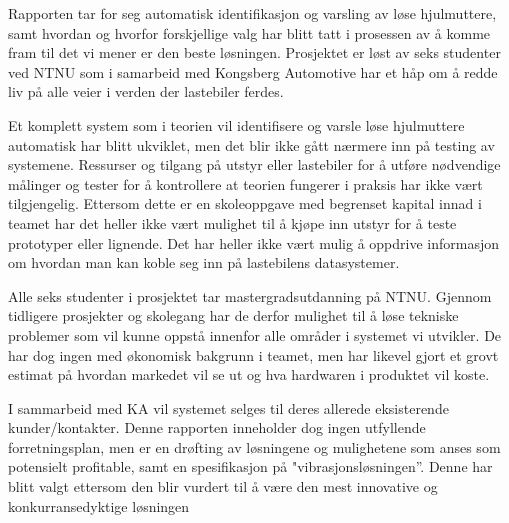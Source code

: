 Rapporten tar for seg automatisk identifikasjon og varsling av løse hjulmuttere, samt hvordan og hvorfor forskjellige
valg har blitt tatt i prosessen av å komme fram til det vi mener er den beste løsningen. Prosjektet er løst av seks studenter ved NTNU
som i samarbeid med Kongsberg Automotive har et håp om å redde liv på alle veier i verden der lastebiler ferdes. 

Et komplett system som i teorien vil identifisere og varsle løse hjulmuttere automatisk har blitt ukviklet, men det blir ikke
gått nærmere inn på testing av systemene. Ressurser og tilgang på utstyr eller lastebiler for å utføre 
nødvendige målinger og tester for å kontrollere at teorien fungerer i praksis har ikke vært tilgjengelig. Ettersom dette er en skoleoppgave med begrenset
kapital innad i teamet har det heller ikke vært mulighet til å kjøpe inn utstyr for å teste prototyper eller lignende. Det har heller ikke 
vært mulig å oppdrive informasjon om hvordan man kan koble seg inn på lastebilens datasystemer.

Alle seks studenter i prosjektet tar mastergradsutdanning på NTNU. Gjennom tidligere prosjekter og skolegang har de derfor
mulighet til å løse tekniske problemer som vil kunne oppstå innenfor alle områder i systemet vi utvikler. De har dog ingen med
økonomisk bakgrunn i teamet, men har likevel gjort et grovt estimat på hvordan markedet vil se ut og hva hardwaren i produktet
vil koste.

I sammarbeid med KA vil systemet selges til deres allerede eksisterende kunder/kontakter. Denne rapporten
inneholder dog ingen utfyllende forretningsplan, men er en drøfting av løsningene og mulighetene som anses som
potensielt profitable, samt en spesifikasjon på "vibrasjonsløsningen''. Denne har blitt valgt ettersom den blir vurdert
til å være den mest innovative og konkurransedyktige løsningen
